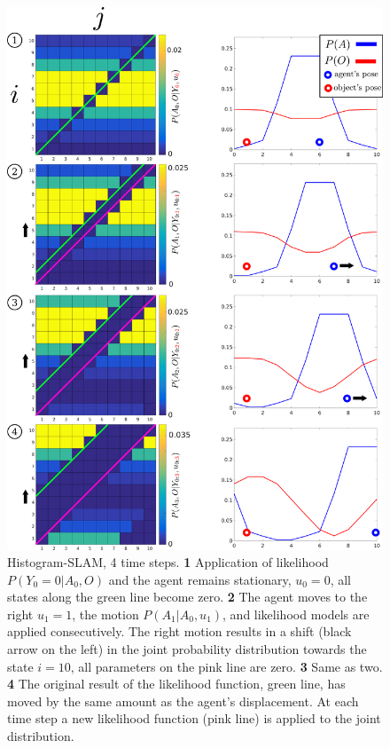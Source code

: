 \begin{figure}
 \centering
  \includegraphics[width=\textwidth]{./ch5-MLMF/Figures/explenation/hist_motion.pdf}
  \caption{Histogram-SLAM, 4 time steps. \textbf{1} Application of likelihood $P(Y_0=0|A_0,O)$ and the agent remains stationary, $u_0=0$, all states along the green line become zero.
  \textbf{2} The agent moves to the right $u_1=1$, the motion $P(A_1|A_0,u_1)$, and likelihood models are applied consecutively. The right motion results in a shift (black arrow on the left) in the joint probability 
  distribution towards the state $i=10$, all parameters on the pink line are zero. \textbf{3} Same as two. \textbf{4} The original result of the likelihood function,
  green line, has moved by the same amount as the agent's displacement. At each time step a new likelihood function (pink line) is applied to the joint distribution.}
  \label{fig:discrete_example}
\end{figure}

